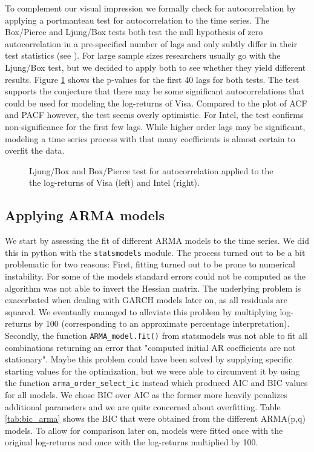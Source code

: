 To complement our visual impression we formally check for autocorrelation by applying a portmanteau test for autocorrelation to the time series. The Box/Pierce and Ljung/Box tests both test the null hypothesis of zero autocorrelation in a pre-specified number of lags and only subtly differ in their test statistics (see \cite{ljung_measure_1978}). For large sample sizes researchers usually go with the Ljung/Box test, but we decided to apply both to see whether they yield different results. Figure \ref{fig:ljungbox} shows the p-values for the first 40 lags for both tests. The test supports the conjecture that there may be some significant autocorrelations that could be used for modeling the log-returns of Visa. Compared to the plot of ACF and PACF however, the test seems overly optimistic. For Intel, the test confirms non-significance for the first few lags. While higher order lags may be significant, modeling a time series process with that many coefficients is almost certain to overfit the data. 

\begin{figure}[h!]
    \centering
    \begin{adjustbox}{width=.95\textwidth,center}
    
    
    \end{adjustbox}
    \caption{Ljung/Box and Box/Pierce test for autocorrelation applied to the the log-returns of Visa (left) and Intel (right).}
    \label{fig:ljungbox}
\end{figure}{}

\subsection{Applying ARMA models}
We start by assessing the fit of different ARMA models to the time series. We did this in python with the \texttt{statsmodels} module. \nocite{noauthor_statsmodels:_nodate} The process turned out to be a bit problematic for two reasons: First, fitting turned out to be prone to numerical instability. For some of the models standard errors could not be computed as the algorithm was not able to invert the Hessian matrix. The underlying problem is exacerbated when dealing with GARCH models later on, as all residuals are squared. We eventually managed to alleviate this problem by multiplying log-returns by 100 (corresponding to an approximate percentage interpretation). Secondly, the function \texttt{ARMA\_model.fit()} from statsmodels was not able to fit all combinations returning an error that "computed initial AR coefficients are not stationary". Maybe this problem could have been solved by supplying specific starting values for the optimization, but we were able to circumvent it by using the function \texttt{arma\_order\_select\_ic} instead which produced AIC and BIC values for all models. We chose BIC over AIC as the former more heavily penalizes additional parameters and we are quite concerned about overfitting. Table \ref{tab:bic_arma} shows the BIC that were obtained from the different ARMA(p,q) models. To allow for comparison later on, models were fitted once with the original log-returns and once with the log-returns multiplied by 100. 

